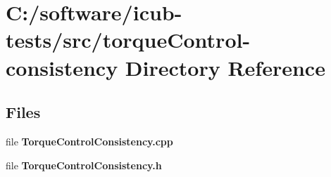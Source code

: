 \section{C\+:/software/icub-\/tests/src/torque\+Control-\/consistency Directory Reference}
\label{dir_ea8250e1e424defa140420a75e35c564}
\subsection*{Files}
\begin{DoxyCompactItemize}
\item 
file {\bfseries Torque\+Control\+Consistency.\+cpp}
\item 
file {\bfseries Torque\+Control\+Consistency.\+h}
\end{DoxyCompactItemize}
